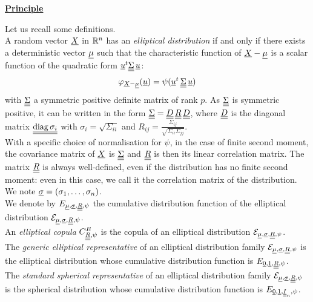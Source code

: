 {  \vspace{2mm}

  \underline{\textbf{Principle}} \vspace{2mm}

  Let us recall some definitions.\\

  A random vector ${\underline{X}}$ in ${\mathbb R}^n$ has an \emph{elliptical distribution} if and only if there exists a deterministic vector ${\underline{\mu}}$ such that the characteristic function of ${\underline{X}} - {\underline{\mu}}$ is a scalar function of the quadratic form ${\underline{u}}^t{\underline{\underline{\Sigma}}}\, {\underline{u}}$:
  \begin{align*}
    \varphi_{{\underline{X}}-{\underline{\mu}}}({\underline{u}})=\psi({\underline{u}}^t\,{\underline{\underline{\Sigma}}}\, {\underline{u}})
  \end{align*}
  with ${\underline{\underline{\Sigma}}}$ a symmetric positive definite matrix of rank $p$. As ${\underline{\underline{\Sigma}}}$ is symmetric positive, it can be written in the form ${\underline{\underline{\Sigma}}}={\underline{\underline{D}}}\,{\underline{\underline{R}}}\,{\underline{\underline{D}}}$, where ${\underline{\underline{D}}}$ is the diagonal matrix ${\underline{\underline{\operatorname*{diag}{\sigma_i}}}}$ with $\sigma_i=\sqrt{\Sigma_{ii}}$ and $R_{ij}=\frac{\Sigma_{ij}}{\sqrt{\Sigma_{ii}\Sigma_{jj}}}$.\\
  With a specific choice of normalisation for $\psi$, in the case of finite second moment, the covariance matrix of ${\underline{X}}$ is ${\underline{\underline{\Sigma}}}$ and ${\underline{\underline{R}}}$ is then its linear correlation matrix. The matrix ${\underline{\underline{R}}}$ is always well-defined, even if the distribution has no finite second moment: even in this case, we call it the correlation matrix of the distribution. We note ${\underline{\sigma}}=(\sigma_1,\dots,\sigma_n)$.\\

  We denote by $E_{{\underline{\mu}},{\underline{\sigma}},{\underline{\underline{R}}},\psi}$ the cumulative distribution function of the elliptical distribution ${\mathcal E}_{{\underline{\mu}},{\underline{\sigma}}, {\underline{\underline{R}}},\psi}$.\\

  An \emph{elliptical copula} $C^E_{{\underline{\underline{R}}},\psi}$ is the copula of an elliptical distribution ${\mathcal E}_{{\underline{\mu}},{\underline{\sigma}},{\underline{\underline{R}}},\psi}$.\\

  The \emph{generic elliptical representative} of an elliptical distribution family ${\mathcal E}_{{\underline{\mu}},{\underline{\sigma}},{\underline{\underline{R}}},\psi}$ is the elliptical distribution whose cumulative distribution function is $E_{{\underline{0}},{\underline{1}},{\underline{\underline{R}}},\psi}$.\\

  The \emph{standard spherical representative} of an elliptical distribution family ${\mathcal E}_{{\underline{\mu}},{\underline{\sigma}},{\underline{\underline{R}}},\psi}$ is the spherical distribution whose cumulative distribution function is $E_{{\underline{0}},{\underline{1}},{\underline{\underline{I}}}_n,\psi}$.\\

}
